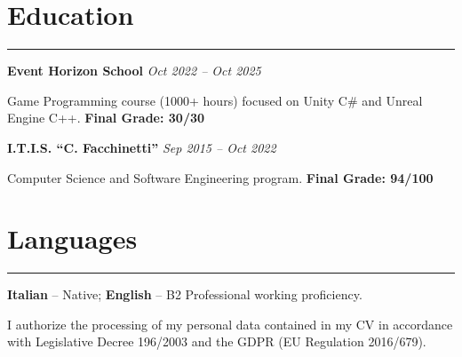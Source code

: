 \documentclass[8.5pt]{article}
\newcommand{\sectionline}{
    \vspace{-2pt}
    \hrule
    \vspace{1pt}
}
\newcommand{\cvsection}[1]{
    \section*{#1}
    \sectionline
}
\begin{document}

    \cvsection{Education}

    \textbf{Event Horizon School}
    \hfill
    \textit{Oct 2022 -- Oct 2025}

    Game Programming course (1000+ hours) focused on Unity C\# and Unreal Engine C++.
    \noindent\hfill\textbf{Final Grade: 30/30}\par

    \vspace{1pt}

    \textbf{I.T.I.S. ``C. Facchinetti''}
    \hfill
    \textit{Sep 2015 -- Oct 2022}

    Computer Science and Software Engineering program.
    \noindent\hfill\textbf{Final Grade: 94/100}\par

    \vspace{2pt}

    \cvsection{Languages}
    \textbf{Italian} – Native; \textbf{English} – B2 Professional working proficiency.

    \centerline{
        \scriptsize
        I authorize the processing of my personal data contained in my CV in accordance with Legislative Decree 196/2003 and the GDPR (EU Regulation 2016/679).
    }
\end{document}
